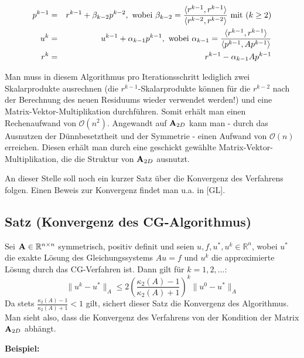 \begin{eqnarray}
p^{k-1} &=& r^{k-1} + \beta_{k-2}p^{k-2}, \textnormal{ wobei } \beta_{k-2} = \frac {\langle r^{k-1}, r^{k-1} \rangle} {\langle r^{k-2}, r^{k-2} \rangle} \textnormal{ mit } (k \ge 2) \notag \\
u^{k} &=& u^{k-1} + \alpha_{k-1}p^{k-1}, \textnormal{ wobei } \alpha_{k-1} = \frac {\langle r^{k-1}, r^{k-1} \rangle} {\langle p^{k-1}, Ap^{k-1} \rangle} \notag \\
r^{k} &=& r^{k-1} - \alpha_{k-1}Ap^{k-1} \notag
\end{eqnarray}

Man muss in diesem Algorithmus pro Iterationsschritt lediglich zwei Skalarprodukte ausrechnen (die $r^{k-1}$-Skalarprodukte können für die $r^{k-2}$ nach der Berechnung des neuen Residuums wieder verwendet werden!) und eine Matrix-Vektor-Multiplikation durchführen. Somit erhält man einen Rechenaufwand von $\mathcal{O}(n^{2})$. Angewandt auf ${\textbf{A}}_{2D}$ kann man - durch das Ausnutzen der Dünnbesetztheit und der Symmetrie - einen Aufwand von $\mathcal{O}(n)$ erreichen. Diesen erhält man durch eine geschickt gewählte Matrix-Vektor-Multiplikation, die die Struktur von ${\textbf{A}}_{2D}$ ausnutzt.

An dieser Stelle soll noch ein kurzer Satz über die Konvergenz des Verfahrens folgen. Einen Beweis zur Konvergenz findet man u.a. in [GL].

\subsection{Satz (Konvergenz des CG-Algorithmus)}\label{ss.Konvergenz CG}

Sei ${\textbf{A}} \in \mathbb{R}^{n \times n}$ symmetrisch, positiv definit und seien $u,f,u^{*},u^{k} \in \mathbb{R}^{n}$, wobei $u^{*}$ die exakte Lösung des Gleichungssystems $Au = f$ und $u^{k}$ die approximierte Lösung durch das CG-Verfahren ist. Dann gilt für $k = 1,2,...$:
\begin{equation}
\| u^{k} - u^{*} \|_{A} \le 2 \left( \frac {\kappa_{2} (A) - 1} {\kappa_{2} (A) + 1} \right)^{k} \| u^{0} - u^{*} \|_{A} \label{eq.konvergenzabsch.}
\end{equation}
Da stets $\frac {\kappa_{2} (A) - 1} {\kappa_{2} (A) + 1} < 1$ gilt, sichert dieser Satz die Konvergenz des Algorithmus. Man sieht also, dass die Konvergenz des Verfahrens von der Kondition der Matrix ${\textbf{A}}_{2D}$ abhängt.

\textbf{Beispiel:}

